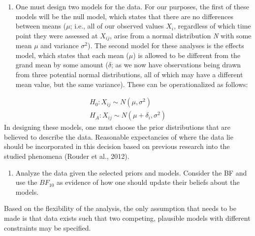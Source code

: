 \documentclass[english,mask,man]{apa6}
\providecommand{\tightlist}{%
  \setlength{\itemsep}{0pt}\setlength{\parskip}{0pt}}
\theoremstyle{definition}
\theoremstyle{definition}
\theoremstyle{definition}
\theoremstyle{remark}
\begin{document}
\begin{enumerate}
\def\labelenumi{\arabic{enumi})}
\tightlist
\item
  One must design two models for the data. For our purposes, the first
  of these models will be the null model, which states that there are no
  differences between means (\(\mu\); i.e., all of our observed values
  \(X_{i}\), regardless of which time point they were assessed at
  \(X_{ij}\), arise from a normal distribution \emph{N} with some mean
  \(\mu\) and variance \(\sigma^2\)). The second model for these
  analyses is the effects model, which states that each mean (\(\mu\))
  is allowed to be different from the grand mean by some amount
  (\(\delta\); as we now have observations being drawn from three
  potential normal distributions, all of which may have a different mean
  value, but the same variance). These can be operationalized as
  follows:
\end{enumerate}

\[
\begin{aligned}
  H_0: X_{ij} \sim N(\mu, \sigma^2) \\
  H_A: X_{ij} \sim N(\mu + \delta_i, \sigma^2)
\end{aligned}
\] In designing these models, one must choose the prior distributions
that are believed to describe the data. Reasonable expectancies of where
the data lie should be incorporated in this decision based on previous
research into the studied phenomena (Rouder et al., 2012).

\begin{enumerate}
\def\labelenumi{\arabic{enumi})}
\setcounter{enumi}{1}
\tightlist
\item
  Analyze the data given the selected priors and models. Consider the BF
  and use the \(BF_{10}\) as evidence of how one should update their
  beliefs about the models.
\end{enumerate}

Based on the flexibility of the analysis, the only assumption that needs
to be made is that data exists such that two competing, plausible models
with different constraints may be specified.
\end{document}
